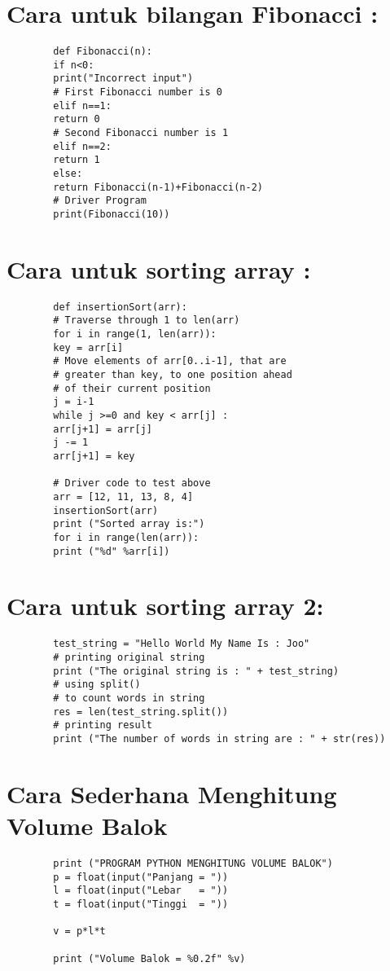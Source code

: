 \documentclass{article}
\begin{document}
	\section {Cara untuk bilangan Fibonacci : }
	\begin{lstlisting}
		def Fibonacci(n):
		if n<0:
		print("Incorrect input")
		# First Fibonacci number is 0
		elif n==1:
		return 0
		# Second Fibonacci number is 1
		elif n==2:
		return 1
		else:
		return Fibonacci(n-1)+Fibonacci(n-2)
		# Driver Program
		print(Fibonacci(10)) 
	\end{lstlisting}

	\section {Cara untuk sorting array :}
	\begin{lstlisting}
		def insertionSort(arr):
		# Traverse through 1 to len(arr)
		for i in range(1, len(arr)):
		key = arr[i]
		# Move elements of arr[0..i-1], that are
		# greater than key, to one position ahead
		# of their current position
		j = i-1
		while j >=0 and key < arr[j] :
		arr[j+1] = arr[j]
		j -= 1
		arr[j+1] = key
		
		# Driver code to test above
		arr = [12, 11, 13, 8, 4]
		insertionSort(arr)
		print ("Sorted array is:")
		for i in range(len(arr)):
		print ("%d" %arr[i]) 
	\end{lstlisting}

	\section {Cara untuk sorting array 2:}
	\begin{lstlisting}
		test_string = "Hello World My Name Is : Joo"
		# printing original string
		print ("The original string is : " + test_string)
		# using split()
		# to count words in string
		res = len(test_string.split())
		# printing result
		print ("The number of words in string are : " + str(res)) 
	\end{lstlisting}

	\section {Cara Sederhana Menghitung Volume Balok}
	\begin{lstlisting}
		print ("PROGRAM PYTHON MENGHITUNG VOLUME BALOK")
		p = float(input("Panjang = "))
		l = float(input("Lebar   = "))
		t = float(input("Tinggi  = "))
		
		v = p*l*t
		
		print ("Volume Balok = %0.2f" %v)
	\end{lstlisting}
\end{document}
